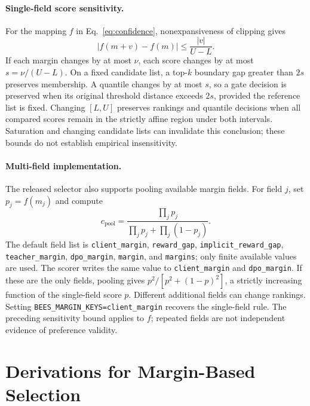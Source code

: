 \paragraph{Single-field score sensitivity.}
For the mapping $f$ in Eq.~\eqref{eq:confidence}, nonexpansiveness
of clipping gives
\begin{equation}
|f(m+v)-f(m)|\leq\frac{|v|}{U-L}.
\end{equation}
If each margin changes by at most $\nu$, each score changes by at most
$s=\nu/(U-L)$. On a fixed candidate list, a top-$k$ boundary gap
greater than $2s$ preserves membership. A quantile changes by at most
$s$, so a gate decision is preserved when its original threshold
distance exceeds $2s$, provided the reference list is fixed.
Changing $[L,U]$ preserves rankings and quantile decisions when all
compared scores remain in the strictly affine region under both
intervals. Saturation and changing candidate lists can invalidate
this conclusion; these bounds do not establish empirical insensitivity.

\paragraph{Multi-field implementation.}
The released selector also supports pooling available margin fields.
For field $j$, set $p_j=f(m_j)$ and compute
\begin{equation}
c_{\mathrm{pool}}=
\frac{\prod_j p_j}{\prod_j p_j+\prod_j(1-p_j)}.
\end{equation}
The default field list is \texttt{client\_margin},
\texttt{reward\_gap}, \texttt{implicit\_reward\_gap},
\texttt{teacher\_margin}, \texttt{dpo\_margin},
\texttt{margin}, and \texttt{margins}; only finite available values
are used. The scorer writes the same value to
\texttt{client\_margin} and \texttt{dpo\_margin}.
If these are the only fields, pooling gives
$p^2/[p^2+(1-p)^2]$, a strictly increasing function of the
single-field score $p$. Different additional fields can change rankings.
Setting \texttt{BEES\_MARGIN\_KEYS=client\_margin} recovers the
single-field rule. The preceding sensitivity bound applies to $f$;
repeated fields are not independent evidence of preference validity.

\section{Derivations for Margin-Based Selection}
\label{app:preference-validity}

